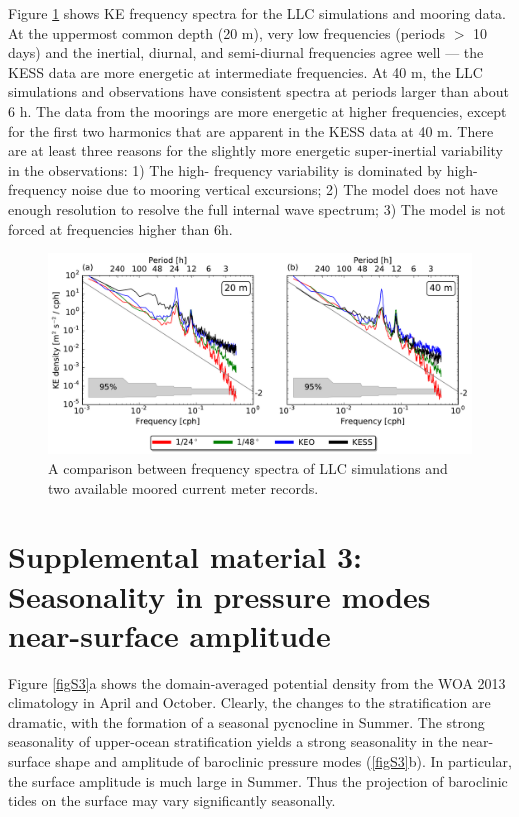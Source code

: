 \documentclass[grl]{agutex2015}
\begin{document}
\begin{article}
Figure \ref{figA1} shows KE frequency spectra for the LLC simulations and mooring data.
At the uppermost common depth (20 m), very low frequencies (periods $>$ 10 days)
and the inertial, diurnal, and semi-diurnal frequencies agree well --- the KESS
data are more energetic at intermediate frequencies. At 40 m, the LLC simulations and observations
have consistent spectra at periods larger than about 6 h. The data from the moorings
are more energetic at higher frequencies,
except for the first two harmonics that are apparent in the KESS data at 40 m.
There are at least three reasons for the slightly more energetic super-inertial
variability in the observations: 1) The high-
frequency variability is dominated by high-frequency noise due to mooring vertical
excursions; 2) The model does not have enough resolution to resolve the full internal
wave spectrum; 3) The model is not forced at frequencies higher than 6h.

\begin{figure}[ht]
   \begin{center}
     \includegraphics[width=.9\textwidth]{figs/figA1.pdf}
  \caption{A comparison between frequency spectra of LLC simulations and two
  available moored current meter records.}
  \label{figA1}
  \end{center}
\end{figure}

\section*{Supplemental material 3: Seasonality in pressure modes near-surface amplitude}

Figure \ref{figS3}a shows the domain-averaged potential density from the WOA 2013
climatology in April and October. Clearly, the changes to the stratification
are dramatic, with the formation of a seasonal pycnocline in Summer. The strong
seasonality of upper-ocean stratification yields a strong seasonality in the
near-surface shape and amplitude of baroclinic pressure modes (\ref{figS3}b).
In particular, the surface amplitude is much large in Summer. Thus the projection
of baroclinic tides on the surface may vary significantly seasonally.


\end{article}
\end{document}
